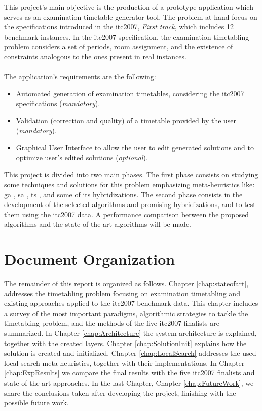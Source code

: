 This project's main objective is the production of a prototype application which serves as an examination timetable generator tool. The problem at hand focus on the specifications introduced in the \gls{itc2007}, \textit{First track}, which includes 12 benchmark instances. In the \gls{itc2007} specification, the examination timetabling problem considers a set of periods, room assignment, and the existence of constraints analogous to the ones present in real instances.\\
\\
The application's requirements are the following:
\begin{itemize}
	\item Automated generation of examination timetables, considering the \gls{itc2007} specifications (\textit{mandatory}).
	\item Validation (correction and quality) of a timetable provided by the user (\textit{mandatory}).
	\item Graphical User Interface to allow the user to edit generated solutions and to optimize user's edited solutions (\textit{optional}).
\end{itemize}
This project is divided into two main phases. The first phase consists on studying some techniques and solutions for this problem emphasizing meta-heuristics like: \gls{ga} \cite{Abdullah2012}, \gls{sa} \cite{Kirkpatrick1983}, \gls{ts} \cite{Smet2007}, and some of its hybridizations. The second phase consists in the development of the selected algorithms and promising hybridizations, and to test them using the \gls{itc2007} data. A performance comparison between the proposed algorithms and the state-of-the-art algorithms will be made.

\section{Document Organization}

The remainder of this report is organized as follows. Chapter \ref{chap:stateofart}, addresses the timetabling problem focusing on examination timetabling and existing approaches applied to the \gls{itc2007} benchmark data. This chapter includes a survey of the most important paradigms, algorithmic strategies to tackle the timetabling problem, and the methods of the five \gls{itc2007} finalists are summarized. In Chapter \ref{chap:Architecture} the system architecture is explained, together with the created layers. Chapter \ref{chap:SolutionInit} explains how the solution is created and initialized. Chapter \ref{chap:LocalSearch} addresses the used local search meta-heuristics, together with their implementations. In Chapter \ref{chap:ExpResults} we compare the final results with the five \gls{itc2007} finalists and state-of-the-art approaches. In the last Chapter, Chapter \ref{chap:FutureWork}, we share the conclusions taken after developing the project, finishing with the possible future work.